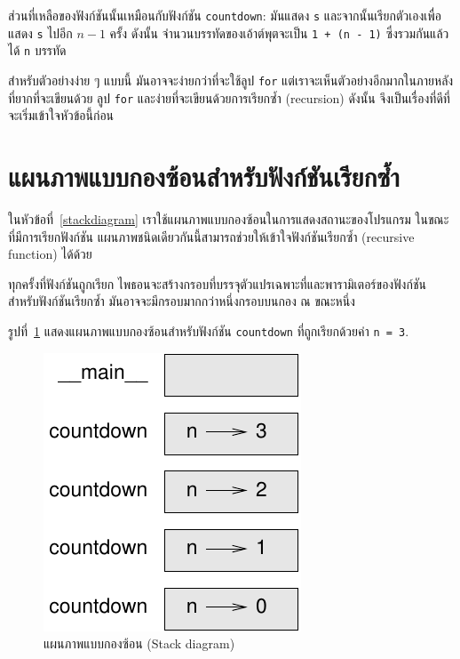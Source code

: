 ส่วนที่เหลือของฟังก์ชันนั้นเหมือนกับฟังก์ชัน {\tt countdown}: มันแสดง {\tt s} และจากนั้นเรียกตัวเองเพื่อแสดง {\tt s} ไปอีก $n-1$ ครั้ง
ดังนั้น จำนวนบรรทัดของเอ้าต์พุตจะเป็น {\tt 1 + (n - 1)} ซึ่งรวมกันแล้วได้ {\tt n} บรรทัด

สำหรับตัวอย่างง่าย ๆ แบบนี้ มันอาจจะง่ายกว่าที่จะใช้ลูป {\tt for} แต่เราจะเห็นตัวอย่างอีกมากในภายหลังที่ยากที่จะเขียนด้วย ลูป {\tt for}
และง่ายที่จะเขียนด้วยการเรียกซ้ำ (recursion)  ดังนั้น จึงเป็นเรื่องที่ดีที่จะเริ่มเข้าใจหัวข้อนี้ก่อน


\section{แผนภาพแบบกองซ้อนสำหรับฟังก์ชันเรียกซ้ำ}%
\label{recursive.stack}

ในหัวข้อที่~\ref{stackdiagram} เราใช้แผนภาพแบบกองซ้อนในการแสดงสถานะของโปรแกรม
ในขณะที่มีการเรียกฟังก์ชัน แผนภาพชนิดเดียวกันนี้สามารถช่วยให้เข้าใจฟังก์ชันเรียกซ้ำ (recursive function) ได้ด้วย

ทุกครั้งที่ฟังก์ชันถูกเรียก ไพธอนจะสร้างกรอบที่บรรจุตัวแปรเฉพาะที่และพารามิเตอร์ของฟังก์ชัน
สำหรับฟังก์ชันเรียกซ้ำ มันอาจจะมีกรอบมากกว่าหนึ่งกรอบบนกอง ณ ขณะหนึ่ง

รูปที่~\ref{fig.stack2} แสดงแผนภาพแบบกองซ้อนสำหรับฟังก์ชัน {\tt countdown} ที่ถูกเรียกด้วยค่า {\tt n = 3}.

\begin{figure}
\centerline
{\includegraphics[scale=0.8]{figs/stack2.pdf}}
\caption{แผนภาพแบบกองซ้อน (Stack diagram)}
\label{fig.stack2}
\end{figure}


